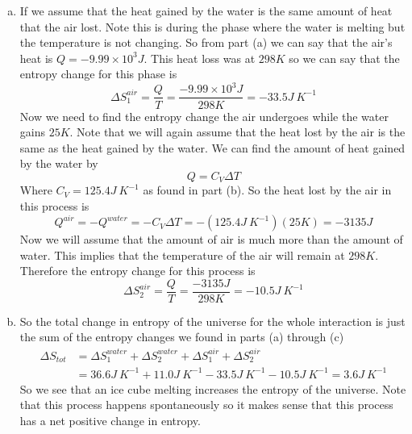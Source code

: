 \documentclass[11pt]{article}
\numberwithin{equation}{section}
\begin{document}
\begin{enumerate}[(a)]
\item
If we assume that the heat gained by the water is the same amount of heat that the air lost. Note this is during the phase where the water is melting but the temperature is not changing. So from part (a) we can say that the air's heat is $Q = -9.99\times10^{3}\unit{J}$. This heat loss was at $298\unit{K}$ so we can say that the entropy change for this phase is
$$\Delta S^{air}_1 = \frac{Q}{T} = \frac{-9.99\times10^{3}\unit{J}}{298\unit{K}} = -33.5\unit{J\ K^{-1}}$$
Now we need to find the entropy change the air undergoes while the water gains $25\unit{K}$. Note that we will again assume that the heat lost by the air is the same as the heat gained by the water. We can find the amount of heat gained by the water by
$$Q = C_V\Delta T$$
Where $C_V = 125.4\unit{J\ K^{-1}}$ as found in part (b). So the heat lost by the air in this process is
$$Q^{air} = -Q^{water} = -C_V\Delta T = -(125.4\unit{J\ K^{-1}})(25\unit{K}) = -3135\unit{J}$$
Now we will assume that the amount of air is much more than the amount of water. This implies that the temperature of the air will remain at $298\unit{K}$. Therefore the entropy change for this process is
$$\Delta S^{air}_2 = \frac{Q}{T} = \frac{-3135\unit{J}}{298\unit{K}} = -10.5\unit{J\ K^{-1}}$$

\item
So the total change in entropy of the universe for the whole interaction is just the sum of the entropy changes we found in parts (a) through (c)
\begin{align*}
\Delta S_{tot} &= \Delta S^{water}_1 + \Delta S^{water}_2 + \Delta S^{air}_1 + \Delta S^{air}_2 \\
&= 36.6\unit{J\ K^{-1}} + 11.0\unit{J\ K^{-1}} - 33.5\unit{J\ K^{-1}} - 10.5\unit{J\ K^{-1}} = 3.6\unit{J\ K^{-1}}
\end{align*}
So we see that an ice cube melting increases the entropy of the universe. Note that this process happens spontaneously so it makes sense that this process has a net positive change in entropy.
\end{enumerate}
\end{document}

